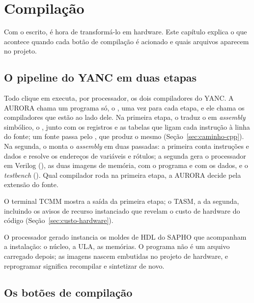 \chapter{Compilação}
\label{cap:compilacao}

Com o  escrito, é hora de transformá-lo em hardware. Este capítulo explica o que acontece quando cada botão de compilação é acionado e quais arquivos aparecem no projeto.

\section{O pipeline do YANC em duas etapas}
\label{sec:pipeline-yanc}

Todo clique em  executa, por processador, os dois compiladores do YANC. A AURORA chama um programa só, o , uma vez para cada etapa, e ele chama os compiladores que estão ao lado dele. Na primeira etapa, o  traduz o  em \textit{assembly} simbólico, o , junto com os registros e as tabelas que ligam cada instrução à linha do fonte; um fonte  passa pelo , que produz o mesmo  (Seção~\ref{sec:caminho-cpp}). Na segunda, o  monta o \textit{assembly} em duas passadas: a primeira conta instruções e dados e resolve os endereços de variáveis e rótulos; a segunda gera o processador em Verilog (), as duas imagens de memória,  com o programa e  com os dados, e o \textit{testbench} (). Qual compilador roda na primeira etapa, a AURORA decide pela extensão do fonte.

O terminal TCMM mostra a saída da primeira etapa; o TASM, a da segunda, incluindo os avisos de recurso instanciado que revelam o custo de hardware do código (Seção~\ref{sec:custo-hardware}).

\begin{info}
O processador gerado instancia os moldes de HDL do SAPHO que acompanham a instalação: o núcleo, a ULA, as memórias. O programa não é um arquivo carregado depois; as imagens  nascem embutidas no projeto de hardware, e reprogramar significa recompilar e sintetizar de novo.
\end{info}

\section{Os botões de compilação}

